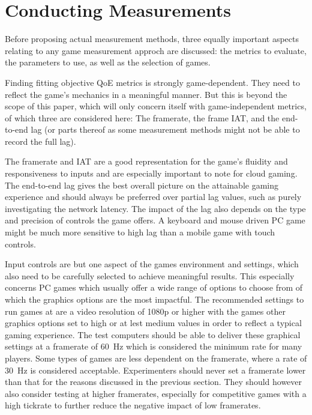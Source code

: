 \section{Conducting Measurements}
\label{sec:measurementgoals}

Before proposing actual measurement methods, three equally important aspects relating to any game measurement approch are discussed: the metrics to evaluate, the parameters to use, as well as the selection of games. 

Finding fitting objective \gls{QoE} metrics is strongly game-dependent. They need to reflect the game's mechanics in a meaningful manner. But this is beyond the scope of this paper, which will only concern itself with game-independent metrics, of which three are considered here: The framerate, the frame \gls{IAT}, and the end-to-end lag (or parts thereof as some measurement methods might not be able to record the full lag).

The framerate and \gls{IAT} are a good representation for the game's fluidity and responsiveness to inputs and are especially important to note for cloud gaming. The end-to-end lag gives the best overall picture on the attainable gaming experience and should always be preferred over partial lag values, such as purely investigating the network latency. The impact of the lag also depends on the type and precision of controls the game offers. A keyboard and mouse driven PC game might be much more sensitive to high lag than a mobile game with touch controls.

Input controls are but one aspect of the games environment and settings, which also need to be carefully selected to achieve meaningful results. This especially concerns PC games which usually offer a wide range of options to choose from of which the graphics options are the most impactful. The recommended settings to run games at are a video resolution of 1080p or higher with the games other graphics options set to high or at lest medium values in order to reflect a typical gaming experience. The test computers should be able to deliver these graphical settings at a framerate of \SI{60}{\hertz} which is considered the minimum rate for many players. Some types of games are less dependent on the framerate, where a rate of \SI{30}{\hertz} is considered acceptable. Experimenters should never set a framerate lower than that for the reasons discussed in the previous section. They should however also consider testing at higher framerates, especially for competitive games with a high tickrate to further reduce the negative impact of low framerates.



